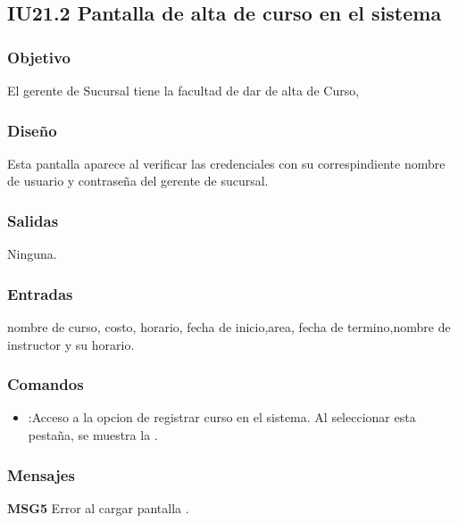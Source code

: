 \subsection{IU21.2 Pantalla de alta de curso en el sistema}

\subsubsection{Objetivo}
	El gerente de Sucursal tiene la facultad de dar de alta de Curso,

\subsubsection{Diseño}
	Esta pantalla aparece al verificar las credenciales con su correspindiente nombre de usuario y contraseña del gerente de sucursal. 


\subsubsection{Salidas}

	Ninguna.

\subsubsection{Entradas}
nombre de curso, costo, horario, fecha de inicio,area, fecha de termino,nombre de instructor y su  horario.

\subsubsection{Comandos}
\begin{itemize}
	\item {}:Acceso a la opcion de registrar curso en el sistema. Al seleccionar esta pestaña, se muestra la .

\end{itemize}

\subsubsection{Mensajes}
	\begin{Citemize}
		\item {\bf MSG5} Error al cargar pantalla .
	\end{Citemize}
	
